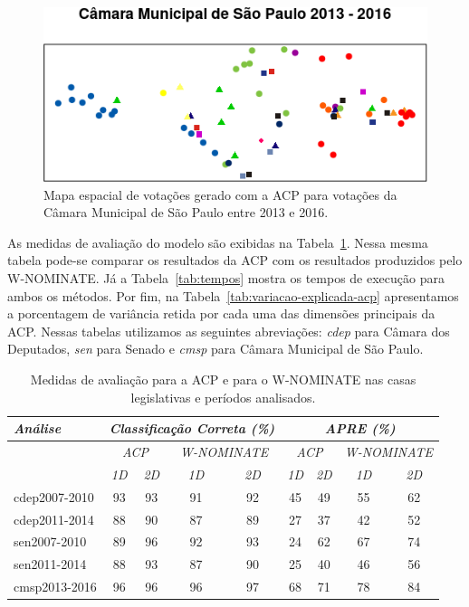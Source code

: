 \documentclass[
	article,			%
	12pt,				%
	oneside,			%
	a4paper,			%
	english,			%
	brazil,				%
	sumario=tradicional,
	oldfontcommands %
	]{abntex2}
\newcommand\wnominate{W-NOMINATE\xspace}
\begin{document}
\begin{figure}[h!]
  \centering
  \includegraphics[scale=0.9]{figs/cmsp2013-2016.png}
  \caption{Mapa espacial de votações gerado com a ACP para votações da Câmara Municipal de São Paulo entre 2013 e 2016.}
  \label{fig:cmsp2013-2016}
\end{figure}

As medidas de avaliação do modelo são exibidas na Tabela~\ref{tab:fit}. Nessa mesma tabela pode-se comparar os resultados da ACP com os resultados produzidos pelo \wnominate. Já a Tabela~\ref{tab:tempos} mostra os tempos de execução para ambos os métodos. Por fim, na Tabela~\ref{tab:variacao-explicada-acp} apresentamos a porcentagem de variância retida por cada uma das dimensões principais da ACP. Nessas tabelas utilizamos as seguintes abreviações: \emph{cdep} para Câmara dos Deputados, \emph{sen} para Senado e \emph{cmsp} para Câmara Municipal de São Paulo.

\begin{table}
\centering
\begin{tabular}{l | c c | c c | c c | c c} 
\itshape Análise & \multicolumn{4}{c|}{\itshape Classificação Correta (\%)} & \multicolumn{4}{|c}{\itshape APRE (\%)} \\ 
\hline 
& \multicolumn{2}{c|}{\itshape ACP} & \multicolumn{2}{|c|}{\itshape \wnominate} & \multicolumn{2}{|c|}{\itshape ACP} & \multicolumn{2}{c}{\itshape \wnominate} \\ 
\hline 
& \itshape 1D & \itshape 2D & \itshape 1D & \itshape 2D & \itshape 1D & \itshape 2D & \itshape 1D & \itshape 2D \\ 
\hline 
cdep2007-2010 & 93 & 93 & 91 & 92 & 45 & 49 & 55 & 62 \\ 
cdep2011-2014 & 88 & 90 & 87 & 89 & 27 & 37 & 42 & 52 \\ 
sen2007-2010  & 89 & 96 & 92 & 93 & 24 & 62 & 67 & 74 \\ 
sen2011-2014  & 88 & 93 & 87 & 90 & 25 & 40 & 46 & 56 \\ 
cmsp2013-2016 & 96 & 96 & 96 & 97 & 68 & 71 & 78 & 84 \\ 
\end{tabular} 
\caption{Medidas de avaliação para a ACP e para o \wnominate nas casas legislativas e períodos analisados.}
\label{tab:fit}
\end{table}
\end{document}
